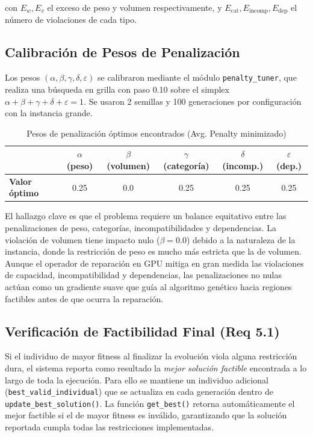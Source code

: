 con $E_w, E_v$ el exceso de peso y volumen respectivamente, y $E_{\text{cat}},
E_{\text{incomp}}, E_{\text{dep}}$ el número de violaciones de cada tipo.

\subsection{Calibración de Pesos de Penalización}

Los pesos $(\alpha, \beta, \gamma, \delta, \varepsilon)$ se calibraron mediante el
módulo \texttt{penalty\_tuner}, que realiza una búsqueda en grilla con paso 0.10
sobre el simplex $\alpha + \beta + \gamma + \delta + \varepsilon = 1$. Se usaron
2 semillas y 100 generaciones por configuración con la instancia grande.

\begin{table}[H]
  \centering
  \caption{Pesos de penalización óptimos encontrados (Avg. Penalty minimizado)}
  \label{tab:penalty}
  \begin{tabular}{lccccc}
    \toprule
    & $\alpha$ (peso) & $\beta$ (volumen) & $\gamma$ (categoría)
    & $\delta$ (incomp.) & $\varepsilon$ (dep.) \\
    \midrule
    \textbf{Valor óptimo} & 0.25 & 0.0 & 0.25 & 0.25 & 0.25 \\
    \bottomrule
  \end{tabular}
\end{table}

El hallazgo clave es que el problema requiere un balance equitativo entre las penalizaciones de peso, categorías, incompatibilidades y dependencias. La violación de volumen tiene impacto nulo ($\beta=0.0$) debido a la naturaleza de la instancia, donde la restricción de peso es mucho más estricta que la de volumen. Aunque el operador de reparación en GPU mitiga en gran medida las violaciones de capacidad, incompatibilidad y dependencias, las penalizaciones no nulas actúan como un gradiente suave que guía al algoritmo genético hacia regiones factibles antes de que ocurra la reparación.

\subsection{Verificación de Factibilidad Final (Req 5.1)}

Si el individuo de mayor fitness al finalizar la evolución viola alguna restricción
dura, el sistema reporta como resultado la \emph{mejor solución factible} encontrada
a lo largo de toda la ejecución. Para ello se mantiene un individuo adicional
(\texttt{best\_valid\_individual}) que se actualiza en cada generación dentro de
\texttt{update\_best\_solution()}. La función \texttt{get\_best()} retorna
automáticamente el mejor factible si el de mayor fitness es inválido, garantizando
que la solución reportada cumpla todas las restricciones implementadas.

